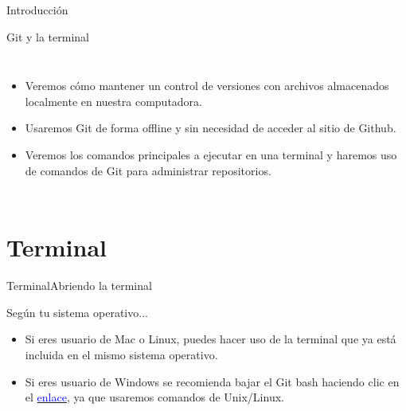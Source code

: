 \documentclass[10pt]{beamer}
\begin{document}
\begin{frame}{Introducción}{}
\begin{block}{Git y la terminal}
\medskip
\begin{columns}[c]
\column{2in}
\begin{itemize}
    \item Veremos cómo mantener un control de versiones con archivos almacenados localmente en nuestra computadora. 
    \item Usaremos Git de forma offline y sin necesidad de acceder al sitio de Github.
    \item Veremos los comandos principales a ejecutar en una terminal y haremos uso de comandos de Git para administrar repositorios.
\end{itemize}

\column{1.5in}
\end{columns}
\end{block}
\end{frame}

\section{Terminal}

\begin{frame}{Terminal}{Abriendo la terminal}
\begin{block}{Según tu sistema operativo...}

\begin{itemize}
        \item Si eres usuario de Mac o Linux, puedes hacer uso de la terminal que ya está incluida en el mismo sistema operativo.\\
        
        \item Si eres usuario de Windows se recomienda bajar el Git bash haciendo clic en el \href{https://git-scm.com/downloads}{\textcolor{blue}{enlace}}, ya que usaremos comandos de Unix/Linux.
\end{itemize}

    
\end{block}

\end{frame}
\end{document}
